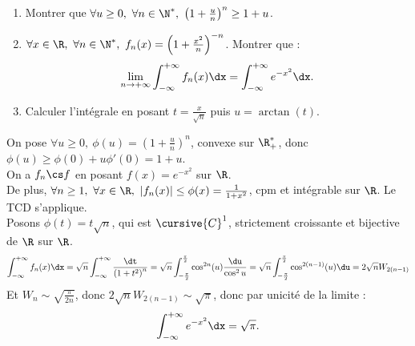 \documentclass[11pt]{article}
\begin{document}
\begin{ex}{}{}
    \begin{enumerate}
        \item Montrer que $\forall u \geq 0, ~ \forall n \in \N^*, ~ \left( 1 + \frac{u}{n} \right)^n \geq 1+u$.
        \item $\forall x \in \R, ~ \forall n \in \N^*, ~ f_n(x)=\left( 1 + \frac{x^2}{n} \right)^{-n}$. Montrer que :
        \begin{equation*}
            \lim_{n\to+\infty}\int_{-\infty}^{+\infty}f_n(x)\dx = \int_{-\infty}^{+\infty}e^{-x^2}\dx.
        \end{equation*}
        \item Calculer l'intégrale en posant $t=\frac{x}{\sqrt{n}}$ puis $u=\arctan(t)$.
    \end{enumerate}
    \tcblower
     On pose $\forall u \geq 0, ~ \phi(u)=\left( 1 + \frac{u}{n} \right)^n$, convexe sur $\R_+^*$, donc $\phi(u)\geq\phi(0)+u\phi'(0)=1+u$.\\
     On a $f_n\cs f$ en posant $f(x)=e^{-x^2}$ sur $\R$.\\
    De plus, $\forall n \geq 1, ~ \forall x \in \R, ~ |f_n(x)|\leq\phi(x)=\frac{1}{1+x^2}$, cpm et intégrable sur $\R$. Le TCD s'applique.\\
     Posons $\phi(t)=t\sqrt{n}$, qui est $\cursive{C}^1$, strictement croissante et bijective de $\R$ sur $\R$.
    \begin{equation*}
        \int_{-\infty}^{+\infty}f_n(x)\dx = \sqrt{n}\int_{-\infty}^{+\infty}\frac{\dt}{\left( 1 + t^2 \right)^n} = \sqrt{n}\int_{-\frac{\pi}{2}}^{\frac{\pi}{2}}\cos^{2n}(u)\frac{\du}{\cos^2u} = \sqrt{n}\int_{-\frac{\pi}{2}}^{\frac{\pi}{2}}\cos^{2(n-1)}(u)\du=2\sqrt{n}W_{2(n-1)}
    \end{equation*}
    Et $W_n\sim\sqrt{\frac{\pi}{2n}}$, donc $2\sqrt{n}W_{2(n-1)}\sim\sqrt{\pi}$, donc par unicité de la limite :
    \begin{equation*}
        \int_{-\infty}^{+\infty}e^{-x^2}\dx = \sqrt{\pi}.
    \end{equation*}
\end{ex}

\pagebreak
\end{document}
